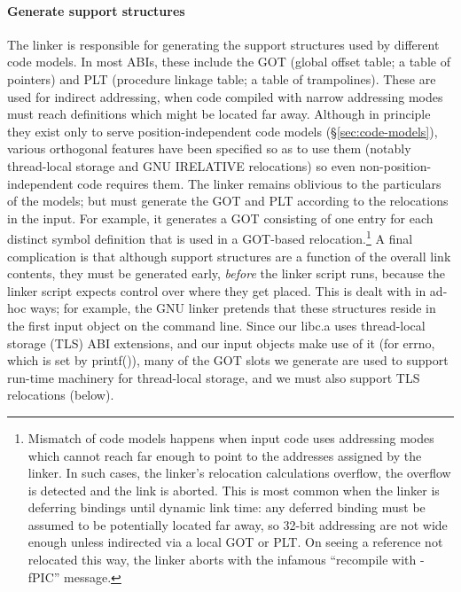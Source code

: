 \paragraph{Generate support structures}
The linker is responsible for generating the support structures used by different code models.
In most ABIs, these include the GOT (global offset table; a table of pointers) and PLT 
(procedure linkage table; a table of trampolines).
These are used for indirect addressing, when code compiled with narrow addressing modes
must reach definitions which might be located far away.
Although in principle they exist only to serve position-independent code models (\S\ref{sec:code-models}), 
various orthogonal features have been specified so as to use them 
(notably thread-local storage and GNU \textsf{IRELATIVE} relocations)  
so even non-position-independent code requires them.
The linker remains oblivious to the particulars of the models;
but must generate the GOT and PLT according to the relocations in the input.
For example, it generates a GOT consisting of one entry 
for each distinct symbol definition that is used in a GOT-based relocation.\footnote{Mismatch 
of code models happens when input code uses addressing modes which cannot reach far enough 
to point to the addresses assigned by the linker.
In such cases, the linker's relocation calculations overflow, the overflow is detected
and the link is aborted.
This is most common when the linker is deferring bindings until dynamic link time: 
any deferred binding must be assumed to be potentially located far away,
so 32-bit addressing are not wide enough unless indirected via a local GOT or PLT.
On seeing a reference not relocated this way, 
the linker aborts with the infamous ``recompile with \textsf{-fPIC}'' message.}
A final complication is that although support structures are a function of the overall link contents,
they must be generated early, \emph{before} the linker script runs, 
because the linker script expects control over where they get placed.
This is dealt with in ad-hoc ways; for example, the GNU linker
pretends that these structures reside in the first input object on the command line.
Since our \textsf{libc.a} uses thread-local storage (TLS) ABI extensions,
and our input objects make use of it (for \textsf{errno}, which is set by \textsf{printf()}),
many of the GOT slots we generate are used to support run-time machinery for thread-local storage,
and we must also support TLS relocations (below).

